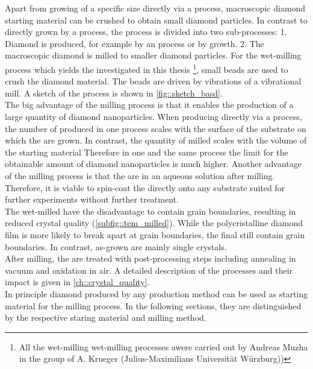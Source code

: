 	Apart from growing \nds of a specific size directly via a \CVD process, macroscopic diamond starting material can be crushed to obtain small diamond particles.
	In contrast to \nds directly grown by a \CVD process, the process is divided into two sub-processes: 
	1. Diamond is produced, for example by an \HPHT process or by \CVD growth.
	2. The macroscopic diamond is milled to smaller diamond particles.
	For the wet-milling process which yields the \nds investigated in this thesis \footnote{All the wet-milling wet-milling processes awere carried out by Andreas Muzha in the group of A. Krueger (Julius-Maximilians Universit\"at W\"urzburg))}, small beads are used to crush the diamond material. 
	The beads are driven by vibrations of a vibrational mill.
	A sketch of the process is shown in \autoref{fig::sketch_basd}.
	\\
	The big advantage of the milling process is that it enables the production of a large quantity of diamond nanoparticles.
	When producing \nds directly via a \CVD process, the number of produced \nds in one process scales with the surface of the substrate on which the \nds are grown.
	In contrast, the quantity of milled \nds scales with the volume of the starting material
	Therefore in one and the same process the limit for the obtainable amount of diamond nanoparticles is much higher.
	Another advantage of the milling process is that the \nds are in an aqueous solution after milling.
	Therefore, it is viable to spin-coat the \nds directly onto any substrate suited for further experiments without further treatment.
	\\
	The wet-milled \nds have the disadvantage to contain grain boundaries, resulting in reduced crystal quality (\autoref{subfig::tem_milled}).
	While the polycristalline diamond film is more likely to break apart at grain boundaries, the final \nds still contain grain boundaries.
	In contrast, as-grown \CVD \nds are mainly single crystals. 
	\\
	After milling, the \nds are treated with post-processing steps including annealing in vacuum and oxidation in air.
	A detailed description of the processes and their impact is given in \ref{ch::crystal_quality}.
	\\
	In principle diamond produced by any production method can be used as starting material for the milling process.
	In the following sections, they are distinguished by the respective staring material and milling method.



